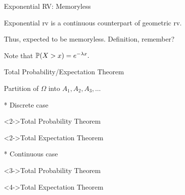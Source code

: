 \begin{frame}{Exponential RV: Memoryless}

\plitemsep 0.1in
\bci
\item<1->  Exponential rv is a continuous counterpart of geometric rv.
\item<2-> Thus, expected to be memoryless. Definition, remember?


\item<4->  Note that $\mathbb{P}( X > x ) = e^{-\lambda x}.$

\eci

\end{frame}

\begin{frame}{Total Probability/Expectation Theorem}

Partition of $\Omega$ into $A_1,A_2,A_3, \ldots$

\medskip

{
\small
* Discrete case
\medskip

\begin{block}<2->{Total Probability Theorem}
 \end{block}

\begin{block}<2->{Total Expectation Theorem}
\end{block}
}
{
\small
* Continuous case
\medskip


\begin{block}<3->{Total Probability Theorem}
 \end{block}

\begin{block}<4->{Total Expectation Theorem}
\end{block}
}

\end{frame}

